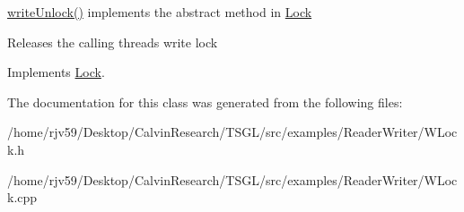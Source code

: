\hyperlink{class_w_lock_a7070d23ba439b826e2310d9ffc65006e}{write\+Unlock()} implements the abstract method in \hyperlink{class_lock}{Lock} 

Releases the calling thread\textquotesingle{}s write lock 

Implements \hyperlink{class_lock}{Lock}.



The documentation for this class was generated from the following files\+:\begin{DoxyCompactItemize}
\item 
/home/rjv59/\+Desktop/\+Calvin\+Research/\+T\+S\+G\+L/src/examples/\+Reader\+Writer/W\+Lock.\+h\item 
/home/rjv59/\+Desktop/\+Calvin\+Research/\+T\+S\+G\+L/src/examples/\+Reader\+Writer/W\+Lock.\+cpp\end{DoxyCompactItemize}
